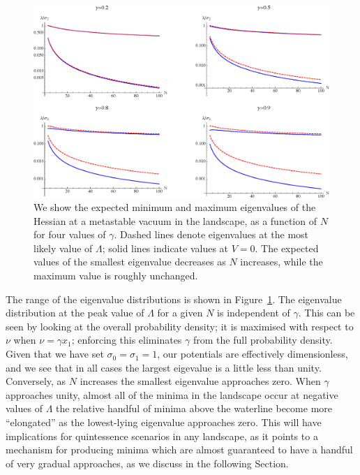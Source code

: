 \documentclass[12pt]{article}
\begin{document}
\begin{figure} 
  \centering
  \includegraphics[width=.9\linewidth]{eign.eps}
  \caption{We show the expected minimum and maximum eigenvalues of the Hessian at a metastable vacuum in the landscape, as a function of $N$ for four values of $\gamma$.  Dashed lines denote eigenvalues at the most likely value of $\Lambda$; solid lines indicate values at $V=0$. The expected values of the smallest eigenvalue decreases as $N$ increases, while the maximum value is roughly unchanged. }
  \label{eigen}
\end{figure}

The range of the eigenvalue distributions is shown in Figure~\ref{eigen}. The eigenvalue distribution at the peak value of $\Lambda$ for a given $N$ is independent of $\gamma$. This can be seen by looking at the overall probability density; it is maximised with respect to $\nu$ when $\nu = \gamma x_1$; enforcing this eliminates $\gamma$ from the full  probability density.     Given that we have set $\sigma_0 = \sigma_1=1$, our potentials are effectively dimensionless, and we see that in all cases the largest eigevalue is a little less than unity. Conversely, as $N$ increases the smallest eigenvalue approaches zero. When $\gamma$ approaches unity, almost all of the minima in the landscape  occur at negative values of $\Lambda$ the relative handful of minima above the waterline become more ``elongated'' as the lowest-lying eigenvalue approaches zero. This will have implications for quintessence scenarios in any landscape, as it points to a mechanism for producing minima which are almost guaranteed to have a handful of very gradual approaches, as we discuss in the following Section. 
\end{document}
